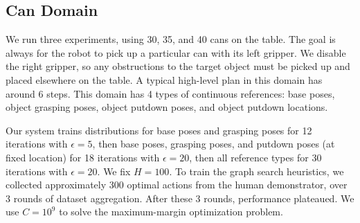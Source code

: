 
\subsection{Can Domain}
We run three experiments, using 30, 35, and 40 cans on the
table.  The goal is always for the robot to pick up a particular can
with its left gripper. We disable the right gripper, so any
obstructions to the target object must be picked up and placed
elsewhere on the table. A typical high-level plan in this domain has around 6 steps.
This domain has 4 types of continuous
references: base poses, object grasping poses, object putdown poses,
and object putdown locations.

Our system trains distributions for base poses and
grasping poses for 12 iterations with $\epsilon = 5$, then base poses,
grasping poses, and putdown poses (at fixed location) for 18
iterations with $\epsilon = 20$, then all reference types for 30
iterations with $\epsilon = 20$. We fix $H = 100$.
To train the graph search heuristics, we collected approximately 300
optimal actions from the human demonstrator, over 3 rounds of dataset aggregation.
After these 3 rounds, performance plateaued. We use $C =
10^{9}$ to solve the maximum-margin optimization problem.


